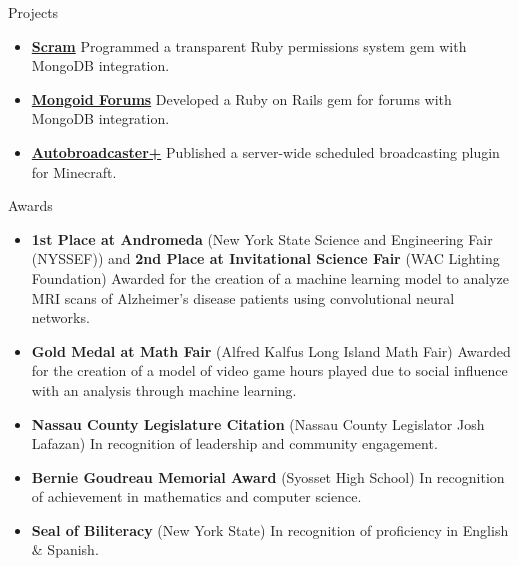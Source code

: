\documentclass[]{mcdowellcv}
\begin{document}
    \begin{cvsection}{Projects}
        \begin{cvsubsection}{}{}{}
            \begin{itemize}
                \setlength\itemsep{3pt}
                \item \textbf{\href{https://github.com/neiljohari/scram}{Scram}}  Programmed a transparent Ruby permissions system gem with MongoDB integration.
                \item \textbf{\href{https://github.com/NJayDevelopment/mongoid_forums) }{Mongoid Forums}} Developed a Ruby on Rails gem for forums with MongoDB integration.
                \item \textbf{\href{https://dev.bukkit.org/projects/abp}{Autobroadcaster+}}  Published a server-wide scheduled broadcasting plugin for Minecraft.
            \end{itemize}
        \end{cvsubsection}
    \end{cvsection}
    \begin{cvsection}{Awards}
        \begin{cvsubsection}{}{}{}
            \begin{itemize}
                \setlength\itemsep{3pt}
                \item \textbf{1st Place at Andromeda} (New York State Science and Engineering Fair (NYSSEF)) and \linebreak \textbf{2nd Place at Invitational Science Fair} (WAC Lighting Foundation) Awarded for the creation of a machine learning model to analyze MRI scans of Alzheimer’s disease patients using convolutional neural networks. 
                \item \textbf{Gold Medal at Math Fair} (Alfred Kalfus Long Island Math Fair) Awarded for the creation of a model of video game hours played due to social influence with an analysis through machine learning. 
                \item \textbf{Nassau County Legislature Citation} (Nassau County Legislator Josh Lafazan)  In recognition of leadership and community engagement. 
                \item \textbf{Bernie Goudreau Memorial Award} (Syosset High School)  In recognition of achievement in mathematics and computer science. 
                \item \textbf{Seal of Biliteracy} (New York State)  In recognition of proficiency in English \& Spanish. 
            \end{itemize}
        \end{cvsubsection}
    \end{cvsection}
\end{document}
